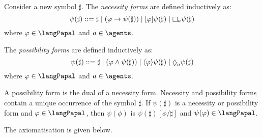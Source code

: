 \begin{definition}
Consider a new symbol $\sharp$. The {\em necessity forms} are defined inductively as: $$\psi(\sharp) ::= \sharp \mid (\phi \implies \psi(\sharp)) \mid \announceA{\phi} \psi(\sharp) \mid \knowsA \psi(\sharp)$$ where $\phi \in \langPapal$ and $\agentA \in \agents$.

The {\em possibility forms} are defined inductively as: $$\psi(\sharp) ::= \sharp \mid (\phi \land \psi(\sharp)) \mid \announceE{\phi} \psi(\sharp) \mid \suspectsA \psi(\sharp)$$ where $\phi \in \langPapal$ and $\agentA \in \agents$.
\end{definition}

A possibility form is the dual of a necessity form. Necessity and possibility forms contain a unique occurrence of the symbol $\sharp$. If $\psi(\sharp)$ is a necessity or possibility form and $\phi \in \langPapal$, then $\psi(\phi)$ is $\psi(\sharp)[\phi/\sharp]$ and $\psi(\phi) \in \langPapal$.

The axiomatisation \axiomPapalS{} is given below.

